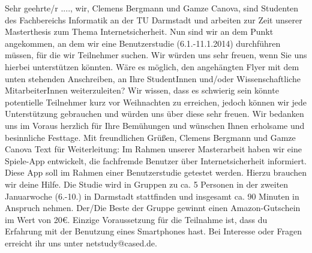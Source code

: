 Sehr geehrte/r ....,
\newline
\newline
wir, Clemens Bergmann und Gamze Canova, sind Studenten des Fachbereichs Informatik an der TU Darmstadt und arbeiten zur Zeit unserer Masterthesis zum Thema Internetsicherheit.
\newline
\newline
Nun sind wir an dem Punkt angekommen, an dem wir eine Benutzerstudie (6.1.-11.1.2014) durchf\"{u}hren m\"{u}ssen, f\"{u}r die wir Teilnehmer suchen. Wir w\"{u}rden uns sehr freuen, wenn Sie uns hierbei unterst\"{u}tzen k\"{o}nnten. W\"{a}re es m\"{o}glich, den angeh\"{a}ngten Flyer mit dem unten stehenden Anschreiben, an Ihre StudentInnen und/oder Wissenschaftliche MitarbeiterInnen  weiterzuleiten? Wir wissen, dass es schwierig sein k\"{o}nnte potentielle Teilnehmer kurz vor Weihnachten zu erreichen, jedoch k\"{o}nnen wir jede Unterst\"{u}tzung gebrauchen und w\"{u}rden uns \"{u}ber diese sehr freuen.
\newline
\newline
Wir bedanken uns im Voraus herzlich f\"{u}r Ihre Bem\"{u}hungen und w\"{u}nschen Ihnen erholsame und besinnliche Festtage.
\newline
\newline
Mit freundlichen Gr\"{u}{\ss}en, 
Clemens Bergmann und Gamze Canova
\newline
\newline
Text f\"{u}r Weiterleitung:
Im Rahmen unserer Masterarbeit haben wir eine Spiele-App entwickelt, die fachfremde Benutzer \"{u}ber Internetsicherheit informiert.  Diese App soll im Rahmen einer Benutzerstudie getestet werden. Hierzu brauchen wir deine Hilfe. Die Studie wird in Gruppen zu ca. 5 Personen in der zweiten Januarwoche (6.-10.) in Darmstadt stattfinden und insgesamt ca. 90 Minuten in Anspruch nehmen.  Der/Die Beste der Gruppe gewinnt einen Amazon-Gutschein im Wert von 20\euro.  Einzige Voraussetzung f\"{u}r die Teilnahme ist, dass du Erfahrung mit der Benutzung eines Smartphones hast. Bei Interesse oder Fragen erreicht ihr uns unter netstudy@cased.de. 



